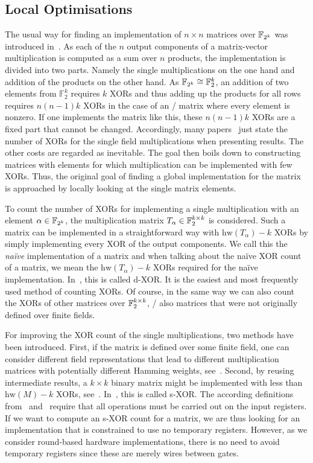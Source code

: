 \subsection{Local Optimisations}
\label{slps:subsec:xor1}
The usual way for finding an implementation of $n \times n$ matrices over $\mathbb{F}_{2^k}$ was introduced in~\cite{CHES:KPPY14}.
As each of the $n$ output components of a matrix-vector multiplication is computed as a sum over $n$ products, the implementation is divided into two parts.
Namely the single multiplications on the one hand and addition of the products on the other hand.
As $\mathbb{F}_{2^k} \cong \mathbb{F}_2^k$, an addition of two elements from $\mathbb{F}_2^k$ requires $k$ XORs and thus adding up the products for all rows requires $n(n-1)k$ XORs in the case of an \MDS/ matrix where every element is nonzero.
If one implements the matrix like this, these $n(n-1)k$ XORs are a fixed part that cannot be changed.
Accordingly, many papers~ just state the number of XORs for the single field multiplications when presenting results.
The other costs are regarded as inevitable.
The goal then boils down to constructing matrices with elements for which multiplication can be implemented with few XORs.
Thus, the original goal of finding a global implementation for the matrix is approached by locally looking at the single matrix elements.

To count the number of XORs for implementing a single multiplication with an element $\alpha \in \mathbb{F}_{2^k}$, the multiplication matrix $T_\alpha \in \mathbb{F}_2^{k \times k}$ is considered.
Such a matrix can be implemented in a straightforward way with $\mathrm{hw}(T_\alpha)-k$ XORs by simply implementing every XOR of the output components.
We call this the \emph{na\"ive} implementation of a matrix and when talking about the na\"ive XOR count of a matrix, we mean the $\mathrm{hw}(T_\alpha)-k$ XORs required for the na\"ive implementation.
In~\cite{ToSC:JPST17}, this is called d-XOR\@.
It is the easiest and most frequently used method of counting XORs.
Of course, in the same way we can also count the XORs of other matrices over $\mathbb{F}_2^{k \times k}$, \ie/ also matrices that were not originally defined over finite fields.

For improving the XOR count of the single multiplications, two methods have been introduced.
First, if the matrix is defined over some finite field, one can consider different field representations that lead to different multiplication matrices with potentially different Hamming weights, see~.
Second, by reusing intermediate results, a $k \times k$ binary matrix might be implemented with less than $\mathrm{hw}(M)-k$ XORs, see~.
In~\cite{ToSC:JPST17}, this is called s-XOR\@.
The according definitions from~\cite{ToSC:JPST17} and~\cite{C:BeiKraLea16} require that all operations must be carried out on the input registers.
If we want to compute an s-XOR count for a matrix, we are thus looking for an implementation that is constrained to use no temporary registers.
However, as we consider round-based hardware implementations, there is no need to avoid temporary registers since these are merely wires between gates.

